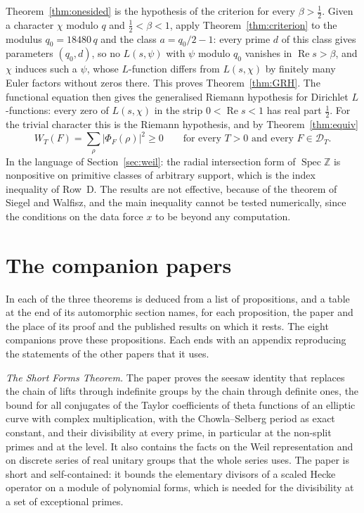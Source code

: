 \documentclass[10pt]{amsart}
\theoremstyle{definition}
\theoremstyle{remark}
\newcommand{\Z}{\mathbb Z}
\newcommand{\Rel}{\operatorname{Re}}
\begin{document}
Theorem~\ref{thm:onesided} is the hypothesis of the criterion for every $\beta>\tfrac12$. Given
a character $\chi$ modulo $q$ and $\tfrac12<\beta<1$, apply Theorem~\ref{thm:criterion} to the
modulus $q_0=18480\,q$ and the class $a=q_0/2-1$: every prime $d$ of this class gives
parameters $(q_0,d)$, so no $L(s,\psi)$ with $\psi$ modulo $q_0$ vanishes in $\Rel s>\beta$, and
$\chi$ induces such a $\psi$, whose $L$-function differs from $L(s,\chi)$ by finitely many
Euler factors without zeros there. This proves Theorem~\ref{thm:GRH}. The functional equation
then gives the generalised Riemann hypothesis for Dirichlet $L$-functions: every zero of
$L(s,\chi)$ in the strip $0<\Rel s<1$ has real part $\tfrac12$. For the trivial character this
is the Riemann hypothesis, and by Theorem~\ref{thm:equiv}
\[
 W_T(F)=\sum_\rho|\Phi_F(\rho)|^2\ge0\qquad\text{for every }T>0\text{ and every }F\in\mathcal D_T .
\]
In the language of Section~\ref{sec:weil}: the radial intersection form of
$\operatorname{Spec}\Z$ is nonpositive on primitive classes of arbitrary support, which is the
index inequality of Row~D. The results are not effective, because of the theorem of Siegel and
Walfisz, and the main inequality cannot be tested numerically, since the conditions on the data
force $x$ to be beyond any computation.

\section{The companion papers}\label{sec:companions}
In \cite{P46} each of the three theorems is deduced from a list of propositions, and a table at
the end of its automorphic section names, for each proposition, the paper and the place of its
proof and the published results on which it rests. The eight companions prove these
propositions. Each ends with an appendix reproducing the statements of the other papers that
it uses.

\emph{The Short Forms Theorem.} The paper \cite{P49} proves the seesaw identity that replaces
the chain of lifts through indefinite groups by the chain through definite ones, the bound for
all conjugates of the Taylor coefficients of theta functions of an elliptic curve with complex
multiplication, with the Chowla--Selberg period as exact constant, and their divisibility at
every prime, in particular at the non-split primes and at the level. It also contains the
facts on the Weil representation and on discrete series of real unitary groups that the whole
series uses. The paper \cite{P50} is short and self-contained: it bounds the elementary divisors
of a scaled Hecke operator on a module of polynomial forms, which is needed for the
divisibility at a set of exceptional primes.
\end{document}
